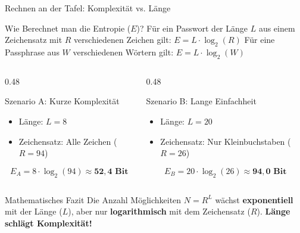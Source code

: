 \documentclass[10pt, aspectratio=169]{beamer}
\begin{document}
\begin{frame}{Rechnen an der Tafel: Komplexität vs. Länge}
  \pause
  \begin{block}{Wie Berechnet man die Entropie ($E$)?}
  Für ein Passwort der Länge $L$ aus einem Zeichensatz mit $R$ verschiedenen Zeichen gilt:
    $E = L \cdot \log_2(R)$
  \pause
  Für eine Passphrase aus $W$ verschiedenen Wörtern gilt:
    $E = L \cdot \log_2(W)$
  \end{block}

  \begin{columns}[T]
    \pause
    \begin{column}{0.48\textwidth}
      \begin{block}{Szenario A: Kurze Komplexität}
        \begin{itemize}
          \item Länge: $L = 8$
          \item Zeichensatz: Alle Zeichen ($R = 94$)
        \end{itemize}
        \[ E_A = 8 \cdot \log_2(94) \approx \mathbf{52{,}4\text{ Bit}} \]
      \end{block}
    \end{column}

    \pause
    \begin{column}{0.48\textwidth}
      \begin{block}{Szenario B: Lange Einfachheit}
        \begin{itemize}
          \item Länge: $L = 20$
          \item Zeichensatz: Nur Kleinbuchstaben ($R = 26$)
        \end{itemize}
        \[ E_B = 20 \cdot \log_2(26) \approx \mathbf{94{,}0\text{ Bit}} \]
      \end{block}
    \end{column}
  \end{columns}

  \pause
  \vspace{1em}
  \begin{alertblock}{Mathematisches Fazit}
    Die Anzahl Möglichkeiten $N = R^L$ wächst \textbf{exponentiell} mit der Länge ($L$), aber nur \textbf{logarithmisch} mit dem Zeichensatz ($R$). \textbf{Länge schlägt Komplexität!}
  \end{alertblock}
\end{frame}
\end{document}
